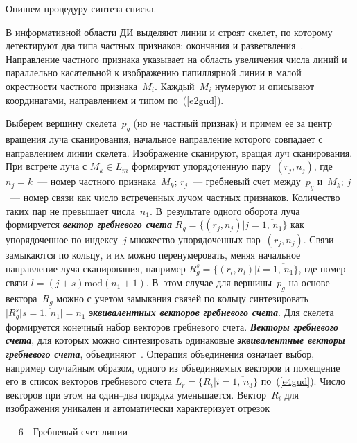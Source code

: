 \begin{multicols}{2}
Опишем процедуру синтеза списка.

В информативной области ДИ выделяют линии и строят скелет, по которому детектируют два
типа частных признаков: окончания и разветвления~\cite{5gud}. Направление частного признака
указывает на область увеличения числа линий и параллельно касательной к изображению
папиллярной линии в малой окрестности частного признака~$M_i$. Каж\-дый~$M_i$ нумеруют и
описывают координатами, направлением и типом по~(\ref{e2gud}).

Выберем вершину скелета~$p_g$ (но не частный признак) и примем ее за центр вращения луча
сканирования, начальное направление которого совпадает с направлением линии скелета.
Изображение сканируют, вращая луч сканирования. При встрече луча с $M_k\in L_m$
формируют упорядоченную пару~$(r_j,n_j)$, где $n_j=k$~--- номер частного признака~$M_k$;
$r_j$~--- гребневый счет между~$p_g$ и~$M_k$; $j$~--- номер связи как число встреченных
лучом частных признаков. Количество таких пар не превышает числа~$n_1$. В~результате
одного оборота луча формируется {\bfseries\textit{вектор гребневого счета}} $R_g
=\{(r_j,n_j)\vert j=\overline{1,\,n_1}\}$ как упорядоченное по индексу~$j$ множество
упорядоченных пар~$(r_j,n_j)$. Связи замыкаются по кольцу, и их можно перенумеровать, меняя
начальное направление луча сканирования, например $R_g^s
=\{(r_l,n_l)\vert l=\overline{1,\,n_1}\}$, где номер связи $l=(j+s)\mathrm{mod}\left (n_1+1\right )$.
В~этом случае для вершины~$p_g$ на основе вектора~$R_g$ можно с учетом замыкания связей
по кольцу синтезировать $\vert R_g^s \vert s=\overline{1,\,n_1}\vert =n_1$
{\bfseries\textit{эквивалентных векторов гребневого счета}}.
Для скелета формируется конечный набор векторов гребневого счета. {\bfseries\textit{Векторы
гребневого счета}}, для которых можно синтезировать одинаковые
{\bfseries\textit{эквивалентные векторы гребневого счета}}, объединяют~\cite{4gud}. Операция
объединения означает выбор, например случайным образом, одного из объединяемых векторов и
помещение его в список векторов гребневого счета $L_r =\{ R_i\vert i=\overline{1,\,n_3}\}$
по~(\ref{e4gud}). Число векторов при этом на один--два порядка уменьшается. Вектор~$R_i$ для
изображения уникален и автоматически характеризует отрезок\linebreak\vspace*{-12pt} 
\begin{center} %
\vspace*{6pt}
\mbox{%
\epsfxsize=73.038mm
}
\vspace*{6pt}
{{\figurename~6}\ \ \small{Гребневый счет линии}}
\end{center}
\vspace*{6pt}



\end{multicols}
